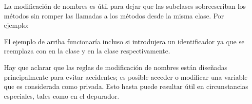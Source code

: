 \documentclass[a4,10pt,spanish]{sphinxmanual}
\begin{document}
\sphinxAtStartPar
La modificación de nombres es útil para dejar que las subclases sobreescriban los métodos sin romper las llamadas a los métodos desde la misma clase.  Por ejemplo:

\begin{sphinxVerbatim}[commandchars=\\\{\}]
 
      
          \PYG{p}{[}\PYG{p}{]}

      
           

         

 

       
            
\end{sphinxVerbatim}

\sphinxAtStartPar
El ejemplo de arriba funcionaría incluso si  introdujera un identificador  ya que se reemplaza con  en la clase   y  en la clase  respectivamente.

\sphinxAtStartPar
Hay que aclarar que las reglas de modificación de nombres están diseñadas principalmente para evitar accidentes; es posible acceder o modificar una variable que es considerada como privada.  Esto hasta puede resultar útil en circunstancias especiales, tales como en el depurador.
\end{document}
